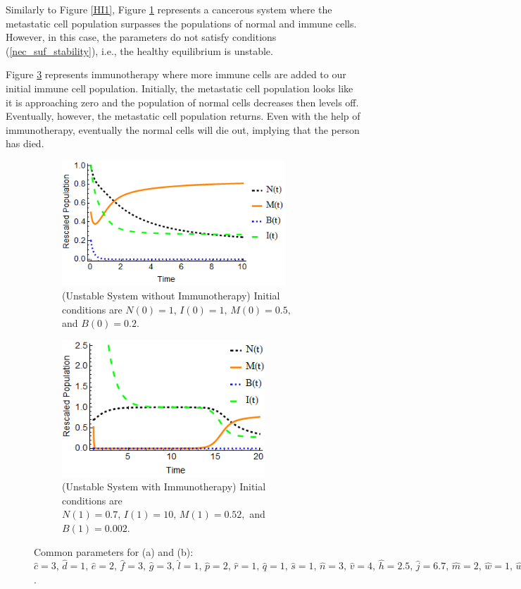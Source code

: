 \documentclass[letter,10pt]{article}
\begin{document}
Similarly to Figure \ref{HI1}, Figure \ref{UHI1} represents a cancerous system where the metastatic cell population surpasses the populations of normal and immune cells. However, in this case, the parameters do not satisfy conditions (\ref{nec_suf_stability}), i.e., the healthy equilibrium is unstable.

Figure \ref{UHI2} represents immunotherapy where more immune cells are added to our initial immune cell population.  Initially, the metastatic cell population looks like it is approaching zero and the population of normal cells decreases then levels off. Eventually, however, the metastatic cell population returns.  Even with the help of immunotherapy, eventually the normal cells will die out, implying that the person has died.

\begin{figure}
\centering
\begin{subfigure}{.45\textwidth}
  \centering
  \includegraphics[width=3.3in]{3a.png}
  \caption{(Unstable System without Immunotherapy) Initial conditions are $N(0)=1, \, I(0)=1, \, M(0)=0.5,$ and  $B(0)=0.2$.}
  \label{UHI1}
\end{subfigure}%
\hfill
\begin{subfigure}{.45\textwidth}
  \centering
  \includegraphics[width=3.0in]{3b.png}
  \caption{(Unstable System with Immunotherapy) Initial conditions are $N(1)=0.7, \, I(1)=10, \, M(1)=0.52,$ and $B(1)=0.002$.}
  \label{UHI2}
\end{subfigure}
\caption{Common parameters for (a) and (b):  $\hat{c}=3, \, \hat{d}=1, \, \hat{e}=2, \, \hat{f}=3, \, \hat{g}=3, \, \hat{l}=1, \, \hat{p}=2, \, \hat{r}=1, \, \hat{q}=1, \, \hat{s}=1, \, \hat{n}=3, \, \hat{v}=4, \, \hat{h}=2.5, \, \hat{j}=6.7, \, \hat{m}=2, \, \hat{w}=1, \, \hat{w}=3$.}
\end{figure}
\end{document}
